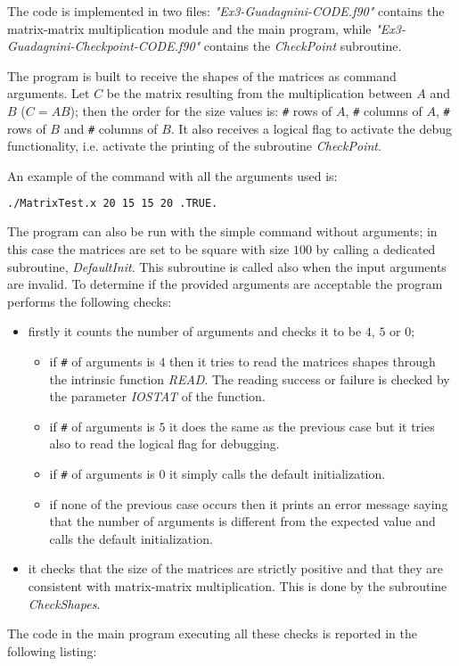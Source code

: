 \documentclass[11pt,a4paper]{article}
\begin{document}
The code is implemented in two files: \textit{"Ex3-Guadagnini-CODE.f90"} contains the matrix-matrix multiplication module and the main program, while \textit{"Ex3-Guadagnini-Checkpoint-CODE.f90"} contains the \textit{CheckPoint} subroutine.

The program is built to receive the shapes of the matrices as command arguments. Let $C$ be the matrix resulting from the multiplication between $A$ and $B$ ($C = AB$); then the order for the size values is: \verb|#| rows of $A$, \verb|#| columns of $A$, \verb|#| rows of $B$ and \verb|#| columns of $B$. 
It also receives a logical flag to activate the debug functionality, i.e. activate the printing of the subroutine \textit{CheckPoint}.

An example of the command with all the arguments used is:
\begin{lstlisting}[language=BASH,numbers=none, caption=Example command]
	./MatrixTest.x 20 15 15 20 .TRUE.
\end{lstlisting}
The program can also be run with the simple command without arguments; in this case the matrices are set to be square with size $100$ by calling a dedicated subroutine, \textit{DefaultInit}. This subroutine is called also when the input arguments are invalid.
To determine if the provided arguments are acceptable the program performs the following checks:
\begin{itemize}
	\item firstly it counts the number of arguments and checks it to be $4$, $5$ or $0$;
	\begin{itemize}
		\item if \verb|#| of arguments is $4$ then it tries to read the matrices shapes through the intrinsic function \textit{READ}. The reading success or failure is checked by the parameter \textit{IOSTAT} of the function.  
		\item if \verb|#| of arguments is $5$ it does the same as the previous case but it tries also to read the logical flag for debugging.
		\item if \verb|#| of arguments is $0$ it simply calls the default initialization.
		\item if none of the previous case occurs then it prints an error message saying that the number of arguments is different from the expected value and calls the default initialization. 
	\end{itemize}
	\item it checks that the size of the matrices are strictly positive and that they are consistent with matrix-matrix multiplication. This is done by the subroutine \textit{CheckShapes}.	
\end{itemize}
The code in the main program executing all these checks is reported in the following listing:

\end{document}
